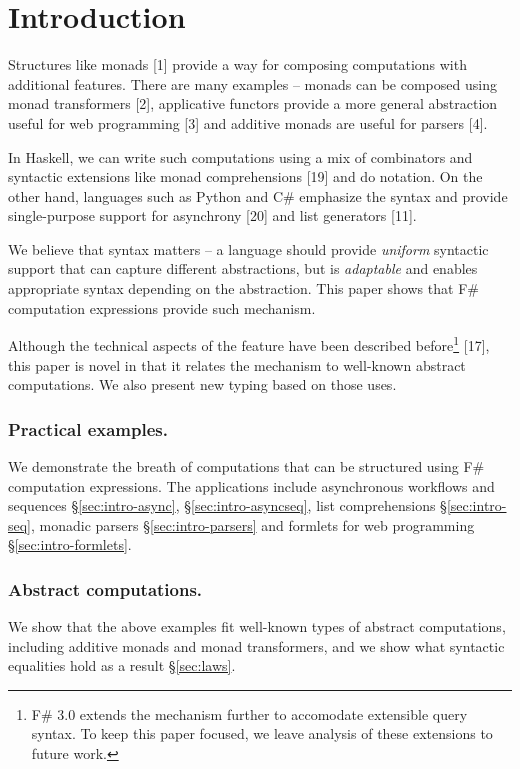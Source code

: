\documentclass[runningheads,a4paper]{llncs}
\begin{document}
\section{Introduction}
Structures like monads [1] provide a way for composing computations with additional features. 
There are many examples -- monads can be composed using monad transformers [2], applicative
functors provide a more general abstraction useful for web programming [3] and additive monads
are useful for parsers [4].

In Haskell, we can write such computations using a mix of combinators and syntactic extensions like 
monad comprehensions [19] and do notation. On the other hand, languages such as Python and C\# 
emphasize the syntax and provide single-purpose support for asynchrony [20] and list generators [11]. 

We believe that syntax matters -- a language should provide \emph{uniform} syntactic support that 
can capture different abstractions, but is \emph{adaptable} and enables appropriate syntax depending
on the abstraction. This paper shows that F\# computation expressions provide such mechanism.

Although the technical aspects of the feature have been described before\footnote{F\# 3.0 extends the 
mechanism further to accomodate extensible query syntax. To keep this paper focused, we leave analysis 
of these extensions to future work.} [17], this paper is novel in that it relates the mechanism to 
well-known abstract computations. We also present new typing based on those uses.

\subsubsection{Practical examples.} 
We demonstrate the breath of computations that can be structured using F\# computation expressions.
The applications include asynchronous workflows and sequences \S\ref{sec:intro-async}, 
\S\ref{sec:intro-asyncseq}, list comprehensions \S\ref{sec:intro-seq}, monadic parsers \S\ref{sec:intro-parsers}
and formlets for web programming \S\ref{sec:intro-formlets}.

\vspace{-1em}
\subsubsection{Abstract computations.} We show that the above examples fit well-known types
of abstract computations, including additive monads and monad transformers, and we show what 
syntactic equalities hold as a result \S\ref{sec:laws}.
\end{document}
